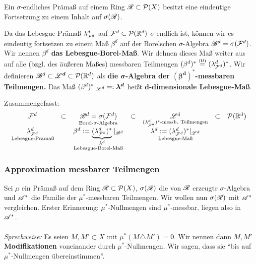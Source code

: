 \begin{korollar}
\begin{mdframed}
Ein $\sigma$-endliches Prämaß auf einem Ring $\RR \subset \PP(X)$ besitzt eine eindeutige Fortsetzung zu einem Inhalt auf $\sigma(\RR)$.
\end{mdframed}
\end{korollar}

\begin{definition}
\begin{mdframed}
Da das Lebesgue-Prämaß $\lambda^d_{\FF^d}$ auf $\FF^d\subset \PP(\R^d)$ $\sigma$-endlich ist, können wir es eindeutig fortsetzen zu einem Maß $\beta^d$ auf der Borelschen $\sigma$-Algebra $\BB^d = \sigma(\FF^d)$. Wir nennen $\beta^d$ \textbf{das Lebesgue-Borel-Maß}. Wir dehnen dieses Maß weiter aus auf alle (bzgl. des äußeren Maßes) messbaren Teilmengen $(\beta^d)^* \overset{\text{\Ueb}}= (\lambda^d_{\FF^d})^*$. Wir definieren $\BB^d \subset \boldsymbol{\LL^d} \subset \PP(\R^d)$ als \textbf{die $\boldsymbol\sigma$-Algebra der $\boldsymbol{(\beta^d)^*}$-messbaren Teilmengen.} Das Maß $(\beta^d)^*|_{\LL^d} =: \boldsymbol{\lambda^d}$ heißt \textbf{$\boldsymbol{d}$-dimensionale Lebesgue-Maß}.
\end{mdframed}
\end{definition}

Zusammengefasst:
\begin{equation*}
\begin{array}{ccccccc}
\FF^d	& \subset & 
	\underset{\text{Borel-}\sigma\text{-Algebra}}{\BB^d=\sigma(\FF^d)} & \subset  & \underset{(\lambda^d_{\FF^d})^*\text{-messb. Teilmengen}}{\LL^d}	& \subset & \PP(\R^d) \\ 
\underset{\text{Lebesgue-Prämaß}}{\lambda^d_{\FF^d}} & &
\underset{\text{Lebesgue-Borel-Maß}}{\beta^d := \underbrace{(\lambda^d_{\FF^d})^*}_{\lambda^d}|_{\BB^d}} &&
\underset{\text{Lebesgue-Maß}}{\lambda^d := (\lambda^d_{\FF^d})^*|_{\LL^d}}
\end{array}
\end{equation*}

\subsubsection{Approximation messbarer Teilmengen}
Sei $\mu$ ein Prämaß auf dem Ring $\RR \subset \PP(X)$, $\sigma(\RR)$ die von $\RR$ erzeugte $\sigma$-Algebra und $\AA^*$ die Familie der $\mu^*$-messbaren Teilmengen. Wir wollen nun $\sigma(\RR)$ mit $\AA^*$ vergleichen. Erster Erinnerung: $\mu^*$-Nullmengen sind $\mu^*$-messbar, liegen also in $\AA^*$.\\\\
\textit{Sprechweise:} Es seien $M,M'\subset X$ mit $\mu^*(M \triangle M') = 0$. Wir nennen dann $M, M'$ \textbf{Modifikationen} voneinander durch $\mu^*$-Nullmengen. Wir sagen, dass sie ``bis auf $\mu^*$-Nullmengen übereinstimmen''.

